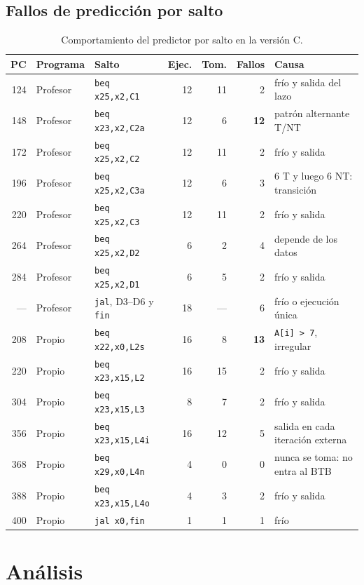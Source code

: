 \documentclass[11pt,a4paper]{article}
\newcommand{\sig}[1]{\texttt{#1}}
\begin{document}
\subsection{Fallos de predicción por salto}

\begin{table}[H]
\centering
\footnotesize
\setlength{\tabcolsep}{4pt}
\begin{tabular}{rllrrrl}
\toprule
PC & Programa & Salto & Ejec. & Tom. & Fallos & Causa \\
\midrule
124 & Profesor & \sig{beq x25,x2,C1} & 12 & 11 & 2 & frío y salida del lazo \\
148 & Profesor & \sig{beq x23,x2,C2a} & 12 & 6 & \textbf{12} & patrón alternante T/NT \\
172 & Profesor & \sig{beq x25,x2,C2} & 12 & 11 & 2 & frío y salida \\
196 & Profesor & \sig{beq x25,x2,C3a} & 12 & 6 & 3 & 6 T y luego 6 NT: transición \\
220 & Profesor & \sig{beq x25,x2,C3} & 12 & 11 & 2 & frío y salida \\
264 & Profesor & \sig{beq x25,x2,D2} & 6 & 2 & 4 & depende de los datos \\
284 & Profesor & \sig{beq x25,x2,D1} & 6 & 5 & 2 & frío y salida \\
— & Profesor & \sig{jal}, D3–D6 y \sig{fin} & 18 & — & 6 & frío o ejecución única \\
\midrule
208 & Propio & \sig{beq x22,x0,L2s} & 16 & 8 & \textbf{13} & \sig{A[i]~>~7}, irregular \\
220 & Propio & \sig{beq x23,x15,L2} & 16 & 15 & 2 & frío y salida \\
304 & Propio & \sig{beq x23,x15,L3} & 8 & 7 & 2 & frío y salida \\
356 & Propio & \sig{beq x23,x15,L4i} & 16 & 12 & 5 & salida en cada iteración externa \\
368 & Propio & \sig{beq x29,x0,L4n} & 4 & 0 & 0 & nunca se toma: no entra al BTB \\
388 & Propio & \sig{beq x23,x15,L4o} & 4 & 3 & 2 & frío y salida \\
400 & Propio & \sig{jal x0,fin} & 1 & 1 & 1 & frío \\
\bottomrule
\end{tabular}
\caption{Comportamiento del predictor por salto en la versión C.}
\label{tab:saltos}
\end{table}

\section{Análisis}
\end{document}
